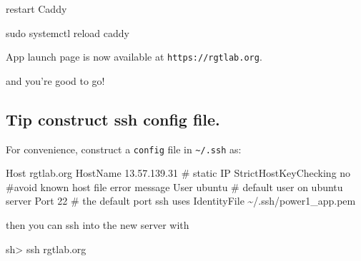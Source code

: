 \documentclass[
  letterpaper,
  DIV=11,
  numbers=noendperiod,
  oneside]{scrartcl}
\newenvironment{Shaded}{\begin{snugshade}}{\end{snugshade}}
\newcommand{\CommentTok}[1]{\textcolor[rgb]{0.37,0.37,0.37}{#1}}
\newcommand{\ExtensionTok}[1]{\textcolor[rgb]{0.00,0.23,0.31}{#1}}
\newcommand{\FunctionTok}[1]{\textcolor[rgb]{0.28,0.35,0.67}{#1}}
\newcommand{\NormalTok}[1]{\textcolor[rgb]{0.00,0.23,0.31}{#1}}
\newcommand{\OperatorTok}[1]{\textcolor[rgb]{0.37,0.37,0.37}{#1}}
\begin{document}
restart Caddy

\begin{Shaded}
\begin{Highlighting}[]
\FunctionTok{sudo}\NormalTok{ systemctl reload caddy}
\end{Highlighting}
\end{Shaded}

App launch page is now available at \texttt{https://rgtlab.org}.

and you're good to go!

\hypertarget{tip-construct-ssh-config-file.}{%
\subsection{Tip construct ssh config
file.}\label{tip-construct-ssh-config-file.}}

For convenience, construct a \texttt{config} file in
\texttt{\textasciitilde{}/.ssh} as:

\begin{Shaded}
\begin{Highlighting}[]
\ExtensionTok{Host}\NormalTok{ rgtlab.org}
\ExtensionTok{HostName}\NormalTok{ 13.57.139.31 }\CommentTok{\# static IP}
\ExtensionTok{StrictHostKeyChecking}\NormalTok{ no  }\CommentTok{\#avoid known host file error message}
\ExtensionTok{User}\NormalTok{ ubuntu }\CommentTok{\# default user on ubuntu server}
\ExtensionTok{Port}\NormalTok{ 22  }\CommentTok{\# the default port ssh uses}
\ExtensionTok{IdentityFile}\NormalTok{ \textasciitilde{}/.ssh/power1\_app.pem}
\end{Highlighting}
\end{Shaded}

then you can ssh into the new server with

\begin{Shaded}
\begin{Highlighting}[]
\FunctionTok{sh}\OperatorTok{\textgreater{}}\NormalTok{ ssh rgtlab.org }
\end{Highlighting}
\end{Shaded}
\end{document}

